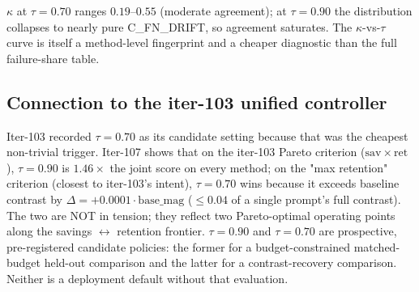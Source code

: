 $\kappa$ at $\tau{=}0.70$ ranges $0.19$--$0.55$ (moderate agreement);
at $\tau{=}0.90$ the distribution collapses to nearly pure C\_FN\_DRIFT,
so agreement saturates.  The $\kappa$-vs-$\tau$ curve is itself a
method-level fingerprint and a cheaper diagnostic than the full
failure-share table.

\subsection{Connection to the iter-103 unified controller}

Iter-103 recorded $\tau{=}0.70$ as its candidate setting because that was
the cheapest non-trivial trigger.  Iter-107 shows that on the iter-103
Pareto criterion ($\mathrm{sav} \times \mathrm{ret}$), $\tau{=}0.90$ is
$1.46\times$ the joint score on every method; on the "max retention"
criterion (closest to iter-103's intent), $\tau{=}0.70$ wins because it
exceeds baseline contrast by $\Delta = +0.0001 \cdot \mathrm{base\_mag}$
($\le 0.04$ of a single prompt's full contrast).  The two are NOT in
tension; they reflect two Pareto-optimal operating points along the
savings $\leftrightarrow$ retention frontier. $\tau{=}0.90$ and
$\tau{=}0.70$ are prospective, pre-registered candidate policies: the former
for a budget-constrained matched-budget held-out comparison and the latter for
a contrast-recovery comparison. Neither is a deployment default without that
evaluation.
